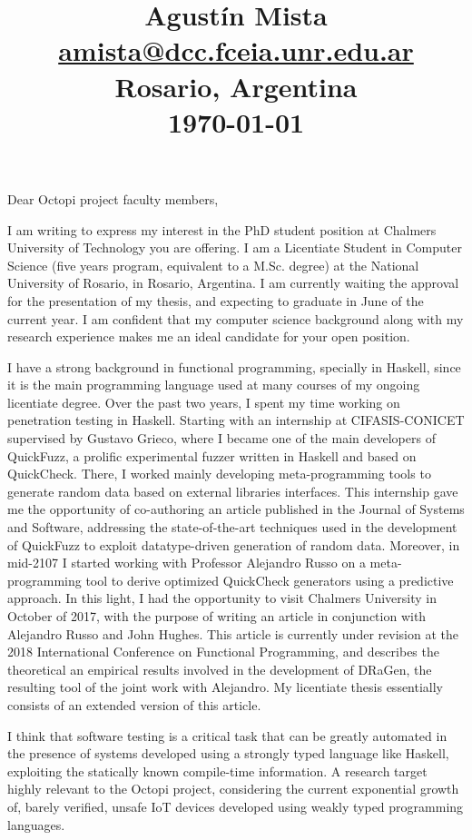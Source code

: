 \documentclass[helvetica,notitle,flagCMYK,totpages,11pt]{europecv}
\title{
  \begin{flushright}
    \Large{Agustín Mista}\\
    \small{\url{amista@dcc.fceia.unr.edu.ar}}\\
    \small{Rosario, Argentina}\\
    \small{\today}
  \end{flushright}
  \vspace{-50pt}
}
\date{}
\begin{document}
\maketitle 

Dear Octopi project faculty members,

I am writing to express my interest in the PhD student position at Chalmers
University of Technology you are offering.
%
I am a Licentiate Student in Computer Science (five years program, equivalent to
a M.Sc. degree) at the National University of Rosario, in Rosario, Argentina.
%
I am currently waiting the approval for the presentation of my thesis, and
expecting to graduate in June of the current year.
%
I am confident that my computer science background along with my research
experience makes me an ideal candidate for your open position.


I have a strong background in functional programming, specially in Haskell,
since it is the main programming language used at many courses of my ongoing
licentiate degree.
%
Over the past two years, I spent my time working on penetration testing in
Haskell. Starting with an internship at CIFASIS-CONICET supervised by Gustavo
Grieco, where I became one of the main developers of QuickFuzz, a prolific
experimental fuzzer written in Haskell and based on QuickCheck.
%
There, I worked mainly developing meta-programming tools to generate random data
based on external libraries interfaces.
%
This internship gave me the opportunity of co-authoring an article published in
the Journal of Systems and Software, addressing the state-of-the-art techniques
used in the development of QuickFuzz to exploit datatype-driven generation of
random data.
%
Moreover, in mid-2107 I started working with Professor Alejandro Russo on a
meta-programming tool to derive optimized QuickCheck generators using a
predictive approach.
%
In this light, I had the opportunity to visit Chalmers University in October of
2017, with the purpose of writing an article in conjunction with Alejandro Russo
and John Hughes.
%
This article is currently under revision at the 2018 International Conference on
Functional Programming, and describes the theoretical an empirical results
involved in the development of DRaGen, the resulting tool of the joint work with
Alejandro.
%
My licentiate thesis essentially consists of an extended version of this
article.


I think that software testing is a critical task that can be greatly automated
in the presence of systems developed using a strongly typed language like
Haskell, exploiting the statically known compile-time information.
%
A research target highly relevant to the Octopi project, considering the current
exponential growth of, barely verified, unsafe IoT devices developed using
weakly typed programming languages.
\end{document}
